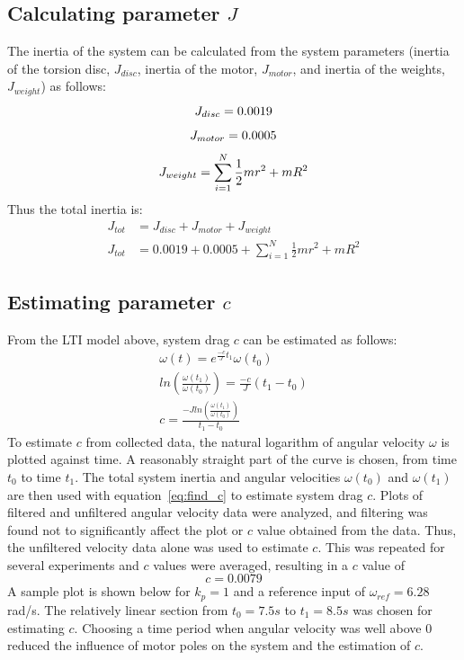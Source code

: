 \documentclass[11pt,titlepage]{article}
\begin{document}
	\subsection{Calculating parameter $J$}
	The inertia of the system can be calculated from the system parameters (inertia of the torsion disc, $J_{disc}$, inertia of the motor, $J_{motor}$, and inertia of the weights, $J_{weight}$) as follows:
	\begin{equation}\label{eq:lti} 
		J_{disc}=0.0019\\
	\end{equation}
	\begin{equation}
		J_{motor}=0.0005\\
	\end{equation}
	\begin{equation}
		J_{weight}=\sum\limits_{i=1}^{N} \frac{1}{2}mr^2 + mR^2\\
	\end{equation}
	Thus the total inertia is:
	\begin{align}
		J_{tot}&=J_{disc}+J_{motor}+J_{weight}\nonumber\\
		J_{tot}&=0.0019+0.0005+\sum\limits_{i=1}^{N} \frac{1}{2}mr^2 + mR^2
	\end{align}

	\subsection{Estimating parameter $c$}
	From the LTI model above, system drag $c$ can be estimated as follows:
	\begin{align}
		\omega(t)=e^{\frac{-c}{J}t_1}\omega(t_0)\nonumber\\
		ln\left( \frac{\omega(t_1)}{\omega(t_0)}\right)=\frac{-c}{J}(t_1-t_0)\nonumber\\
		c=\frac{-Jln\left(\frac{\omega(t_1)}{\omega(t_0)}\right)}{t_1-t_0}\label{eq:find_c}
	\end{align}
	To estimate $c$ from collected data, the natural logarithm of angular velocity $\omega$ is plotted against time. A reasonably straight part of the curve is chosen, from time $t_0$ to time $t_1$. The total system inertia and angular velocities $\omega(t_0)$ and $\omega(t_1)$ are then used with equation~\ref{eq:find_c} to estimate system drag $c$. Plots of filtered and unfiltered angular velocity data were analyzed, and filtering was found not to significantly affect the plot or $c$ value obtained from the data. Thus, the unfiltered velocity data alone was used to estimate $c$. This was repeated for several experiments and $c$ values were averaged, resulting in a $c$ value of 
	\begin{equation}
		c=0.0079\nonumber
	\end{equation}
	A sample plot is shown below for $k_p=1$ and a reference input of $\omega_{ref}=6.28$ rad/s. The relatively linear section from $t_0=7.5s$ to $t_1=8.5s$ was chosen for estimating $c$. Choosing a time period when angular velocity was well above 0 reduced the influence of motor poles on the system and the estimation of $c$.
	
\end{document}
